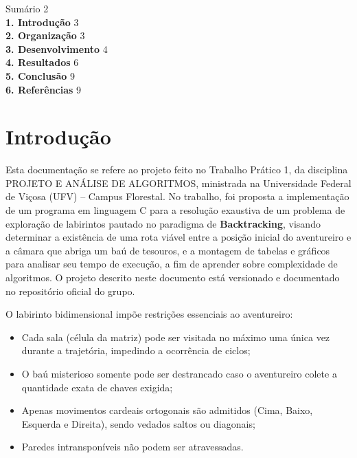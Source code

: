 \documentclass[12pt,a4paper]{article}
\renewcommand{\_}{\textunderscore\allowbreak}
\begin{document}
\noindent
Sumário \hfill 2\\[0.35cm]
\textbf{1. Introdução} \hfill 3\\[0.35cm]
\textbf{2. Organização} \hfill 3\\[0.35cm]
\textbf{3. Desenvolvimento} \hfill 4\\[0.35cm]
\textbf{4. Resultados} \hfill 6\\[0.35cm]
\textbf{5. Conclusão} \hfill 9\\[0.35cm]
\textbf{6. Referências} \hfill 9

\newpage
\section{Introdução}

Esta documentação se refere ao projeto feito no Trabalho Prático 1, da disciplina PROJETO E ANÁLISE DE ALGORITMOS, ministrada na Universidade Federal de Viçosa (UFV) -- Campus Florestal. No trabalho, foi proposta a implementação de um programa em linguagem C para a resolução exaustiva de um problema de exploração de labirintos pautado no paradigma de \textbf{Backtracking}, visando determinar a existência de uma rota viável entre a posição inicial do aventureiro e a câmara que abriga um baú de tesouros, e a montagem de tabelas e gráficos para analisar seu tempo de execução, a fim de aprender sobre complexidade de algoritmos. O projeto descrito neste documento está versionado e documentado no repositório oficial do grupo.

O labirinto bidimensional impõe restrições essenciais ao aventureiro:
\begin{itemize}
    \item Cada sala (célula da matriz) pode ser visitada no máximo uma única vez durante a trajetória, impedindo a ocorrência de ciclos;
    \item O baú misterioso somente pode ser destrancado caso o aventureiro colete a quantidade exata de chaves exigida;
    \item Apenas movimentos cardeais ortogonais são admitidos (Cima, Baixo, Esquerda e Direita), sendo vedados saltos ou diagonais;
    \item Paredes intransponíveis não podem ser atravessadas.
\end{itemize}
\end{document}
